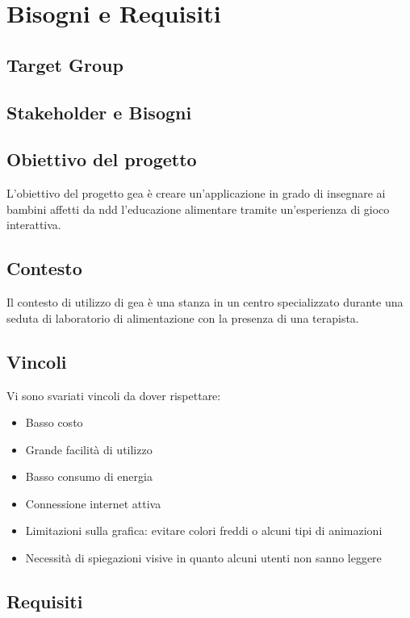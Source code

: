 \section{Bisogni e Requisiti} \label{sec:biso}

\subsection{Target Group} \label{subsec:target}


\subsection{Stakeholder e Bisogni} \label{subsec:stakbis}


\subsection{Obiettivo del progetto} \label{subsec:obiettivo}
L'obiettivo del progetto \acs{gea} è creare un'applicazione in grado di insegnare ai bambini affetti da \acs{ndd} l'educazione alimentare tramite un'esperienza di gioco interattiva.


\subsection{Contesto} \label{subsec:contesto}
Il contesto di utilizzo di \acs{gea} è una stanza in un centro specializzato durante una seduta di laboratorio di alimentazione con la presenza di una terapista.


\subsection{Vincoli} \label{subsec:vincoli}
Vi sono svariati vincoli da dover rispettare:
\begin{itemize}
\item Basso costo
\item Grande facilità di utilizzo
\item Basso consumo di energia
\item Connessione internet attiva
\item Limitazioni sulla grafica: evitare colori freddi o alcuni tipi di animazioni
\item Necessità di spiegazioni visive in quanto alcuni utenti non sanno leggere
\end{itemize}


\subsection{Requisiti} \label{subsec:requis}